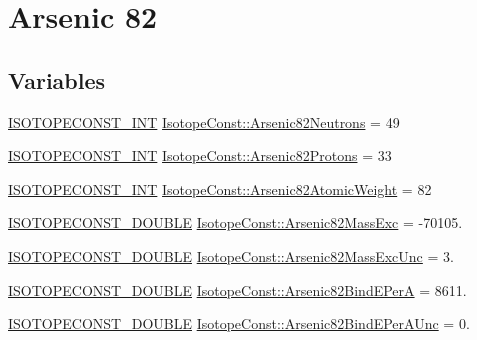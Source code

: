 \hypertarget{group___isotope_const-_arsenic-_as82}{}\section{Arsenic 82}
\label{group___isotope_const-_arsenic-_as82}
\subsection*{Variables}
\begin{DoxyCompactItemize}
\item 
\mbox{\hyperlink{group___isotope_const-_macros_ga5f18360b3e99483a35c32d789e62621c}{I\+S\+O\+T\+O\+P\+E\+C\+O\+N\+S\+T\+\_\+\+I\+NT}} \mbox{\hyperlink{group___isotope_const-_arsenic-_as82_ga06d09ae0da934613b92518971c12e98e}{Isotope\+Const\+::\+Arsenic82\+Neutrons}} = 49
\item 
\mbox{\hyperlink{group___isotope_const-_macros_ga5f18360b3e99483a35c32d789e62621c}{I\+S\+O\+T\+O\+P\+E\+C\+O\+N\+S\+T\+\_\+\+I\+NT}} \mbox{\hyperlink{group___isotope_const-_arsenic-_as82_ga7d75f073167c2ce38739d9278980bc24}{Isotope\+Const\+::\+Arsenic82\+Protons}} = 33
\item 
\mbox{\hyperlink{group___isotope_const-_macros_ga5f18360b3e99483a35c32d789e62621c}{I\+S\+O\+T\+O\+P\+E\+C\+O\+N\+S\+T\+\_\+\+I\+NT}} \mbox{\hyperlink{group___isotope_const-_arsenic-_as82_gad590d27dc1e3d7698dd40ca5d2c15ff4}{Isotope\+Const\+::\+Arsenic82\+Atomic\+Weight}} = 82
\item 
\mbox{\hyperlink{group___isotope_const-_macros_ga8f45a7272ce02c0b4c65c44636ed719a}{I\+S\+O\+T\+O\+P\+E\+C\+O\+N\+S\+T\+\_\+\+D\+O\+U\+B\+LE}} \mbox{\hyperlink{group___isotope_const-_arsenic-_as82_ga1c3fc2ed2ff57cfe46fc218620011b59}{Isotope\+Const\+::\+Arsenic82\+Mass\+Exc}} = -\/70105.
\item 
\mbox{\hyperlink{group___isotope_const-_macros_ga8f45a7272ce02c0b4c65c44636ed719a}{I\+S\+O\+T\+O\+P\+E\+C\+O\+N\+S\+T\+\_\+\+D\+O\+U\+B\+LE}} \mbox{\hyperlink{group___isotope_const-_arsenic-_as82_gac62c967bf1c8ce0ac03327a7cc4a937f}{Isotope\+Const\+::\+Arsenic82\+Mass\+Exc\+Unc}} = 3.
\item 
\mbox{\hyperlink{group___isotope_const-_macros_ga8f45a7272ce02c0b4c65c44636ed719a}{I\+S\+O\+T\+O\+P\+E\+C\+O\+N\+S\+T\+\_\+\+D\+O\+U\+B\+LE}} \mbox{\hyperlink{group___isotope_const-_arsenic-_as82_gadc40a44a1cc7702a8cdcb65d43de5901}{Isotope\+Const\+::\+Arsenic82\+Bind\+E\+PerA}} = 8611.
\item 
\mbox{\hyperlink{group___isotope_const-_macros_ga8f45a7272ce02c0b4c65c44636ed719a}{I\+S\+O\+T\+O\+P\+E\+C\+O\+N\+S\+T\+\_\+\+D\+O\+U\+B\+LE}} \mbox{\hyperlink{group___isotope_const-_arsenic-_as82_ga2f2eb0868ad96bc643de0cdfcf91af5c}{Isotope\+Const\+::\+Arsenic82\+Bind\+E\+Per\+A\+Unc}} = 0.

\end{DoxyCompactItemize}
